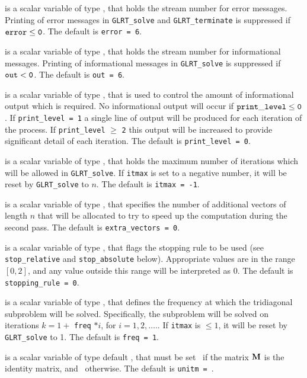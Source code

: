 \documentclass{galahad}
\newcommand{\packagename}{GL\-RT}
\begin{document}
\begin{description}
 is a scalar variable of type \integer, that holds the
stream number for error messages.
Printing of error messages in
{\tt \packagename\_solve} and {\tt \packagename\_terminate}
is suppressed if ${\tt error} \leq {\tt 0}$.
The default is {\tt error = 6}.

 is a scalar variable of type \integer, that holds the
stream number for informational messages.
Printing of informational messages in
{\tt \packagename\_solve} is suppressed if ${\tt out} < {\tt 0}$.
The default is {\tt out = 6}.

 is a scalar variable of type \integer,
that is used
to control the amount of informational output which is required. No
informational output will occur if ${\tt print\_level} \leq {\tt 0}$. If
{\tt print\_level = 1} a single line of output will be produced for each
iteration of the process. If {\tt print\_level} $\geq$ {\tt 2} this output
will be increased to provide significant detail of each iteration.
The default is {\tt print\_level = 0}.

 is a scalar variable of type \integer, that holds the
maximum number of iterations which will be allowed in
{\tt \packagename\_solve}.
If {\tt itmax} is set to a negative number, it will be reset by
{\tt \packagename\_solve} to $n$.
The default is {\tt itmax = -1}.

 is a scalar variable of type \integer,
that specifies the number of additional vectors of length $n$
that will be allocated to try to speed up the computation during the
second pass.
The default is {\tt extra\_vectors = 0}.

 is a scalar variable of type \integer, that
flags the stopping rule to be used (see {\tt stop\_relative} and
{\tt stop\_absolute} below).
Appropriate values are in the range $[0,2]$, and any value outside this range
will be interpreted as 0.
The default is {\tt stopping\_rule = 0}.

 is a scalar variable of type \integer, that
defines the frequency at which the tridiagonal subproblem will
be solved. Specifically, the subproblem will be solved on iterations
$k=1+$ {\tt freq} $\ast i$, for $i = 1, 2, \ldots.$.
If {\tt itmax} is $\leq 1$, it will be reset by
{\tt \packagename\_solve} to 1.
The default is {\tt freq = 1}.

 is a scalar variable of type default \logical, that
must be set \true\ if the matrix ${\mathbf{M}}$ is the identity matrix, and
\false\ otherwise.
The default is {\tt unitm = \true}.


\end{description}
\end{document}
